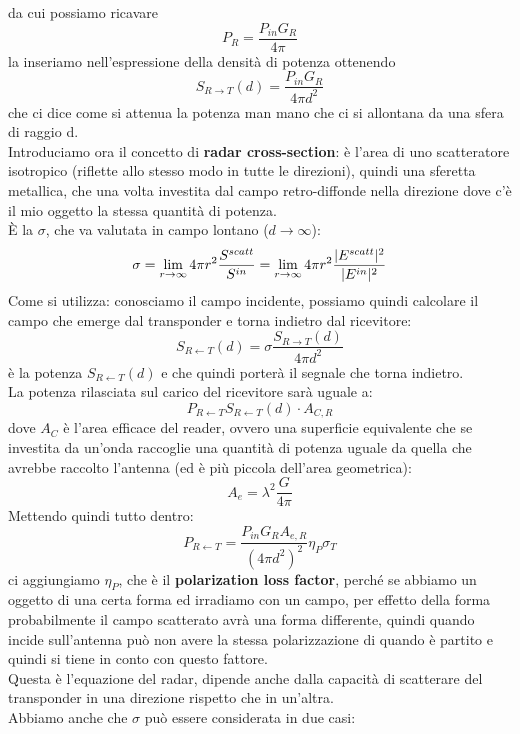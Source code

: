 \documentclass[oneside, 12pt]{extbook}
\DeclarePairedDelimiter{\abs}{\lvert}{\rvert}
\begin{document}
da cui possiamo ricavare 
\begin{equation}
	P_R = \frac{P_{in}G_R}{4 \pi}	
\end{equation}
la inseriamo nell'espressione della densità di potenza ottenendo 
\begin{equation}
	S_{R \rightarrow T}(d) = \frac{P_{in}G_R}{4 \pi d^2}	
\end{equation}
che ci dice come si attenua la potenza man mano che ci si allontana da una sfera di raggio d.\\Introduciamo ora il concetto di \textbf{radar cross-section}: è l'area di uno scatteratore isotropico (riflette allo stesso modo in tutte le direzioni), quindi una sferetta metallica, che una volta investita dal campo retro-diffonde nella direzione dove c'è il mio oggetto la stessa quantità di potenza.\\È la $\sigma$, che va valutata in campo lontano ($d \rightarrow \infty$):
\begin{equation}
	\sigma = \lim\limits_{r \rightarrow \infty} 4 \pi r^2 \dfrac{S^{scatt}}{S^{in}} = \lim\limits_{r \rightarrow \infty} 4 \pi r^2 \dfrac{\abs{E^{scatt}}^2}{\abs{E^{in}}^2}
\end{equation}
Come si utilizza: conosciamo il campo incidente, possiamo quindi calcolare il campo che emerge dal transponder e torna indietro dal ricevitore: 
\begin{equation}
	S_{R \leftarrow T}(d) = \sigma \dfrac{S_{R \rightarrow T}(d)}{4\pi d^2}
\end{equation}
è la potenza $S_{R \leftarrow T}(d)$ e che quindi porterà il segnale che torna indietro.\\La potenza rilasciata sul carico del ricevitore sarà uguale a: 
\begin{equation}
	P_{R \leftarrow T}S_{R \leftarrow T}(d) \cdot A_{C,R}
\end{equation}
dove $A_C$ è l'area efficace del reader, ovvero una superficie equivalente che se investita da un'onda raccoglie una quantità di potenza uguale da quella che avrebbe raccolto l'antenna (ed è più piccola dell'area geometrica): 
\begin{equation}
	A_e = \lambda^2 \frac{G}{4 \pi}
\end{equation}
Mettendo quindi tutto dentro: 
\begin{equation}
	P_{R \leftarrow T} = \dfrac{P_{in}G_RA_{e,R}}{(4\pi d^2)^2} \eta_P \sigma_T
\end{equation}
ci aggiungiamo $\eta_P$, che è il \textbf{polarization loss factor}, perché se abbiamo un oggetto di una certa forma ed irradiamo con un campo, per effetto della forma probabilmente il campo scatterato avrà una forma differente, quindi quando incide sull'antenna può non avere la stessa polarizzazione di quando è partito e quindi si tiene in conto con questo fattore.\\Questa è l'equazione del radar, dipende anche dalla capacità di scatterare del transponder in una direzione rispetto che in un'altra.\\Abbiamo anche che $\sigma$ può essere considerata in due casi:
\end{document}
